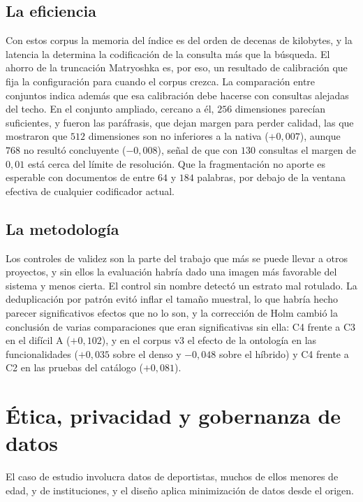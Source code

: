 \documentclass[11pt,letterpaper]{article}
\numberwithin{equation}{section}
\begin{document}
\subsection*{La eficiencia}
Con estos corpus la memoria del índice es del orden de decenas de kilobytes, y la latencia la determina la codificación de la consulta más que la búsqueda. El ahorro de la truncación Matryoshka es, por eso, un resultado de calibración que fija la configuración para cuando el corpus crezca. La comparación entre conjuntos indica además que esa calibración debe hacerse con consultas alejadas del techo. En el conjunto ampliado, cercano a él, $256$ dimensiones parecían suficientes, y fueron las paráfrasis, que dejan margen para perder calidad, las que mostraron que $512$ dimensiones son no inferiores a la nativa ($+0{,}007$), aunque $768$ no resultó concluyente ($-0{,}008$), señal de que con $130$ consultas el margen de $0{,}01$ está cerca del límite de resolución. Que la fragmentación no aporte es esperable con documentos de entre $64$ y $184$ palabras, por debajo de la ventana efectiva de cualquier codificador actual.

\subsection*{La metodología}
Los controles de validez son la parte del trabajo que más se puede llevar a otros proyectos, y sin ellos la evaluación habría dado una imagen más favorable del sistema y menos cierta. El control sin nombre detectó un estrato mal rotulado. La deduplicación por patrón evitó inflar el tamaño muestral, lo que habría hecho parecer significativos efectos que no lo son, y la corrección de Holm cambió la conclusión de varias comparaciones que eran significativas sin ella: C4 frente a C3 en el difícil A ($+0{,}102$), y en el corpus v3 el efecto de la ontología en las funcionalidades ($+0{,}035$ sobre el denso y $-0{,}048$ sobre el híbrido) y C4 frente a C2 en las pruebas del catálogo ($+0{,}081$).

\section{Ética, privacidad y gobernanza de datos}
\label{sec:etica}
El caso de estudio involucra datos de deportistas, muchos de ellos menores de edad, y de instituciones, y el diseño aplica minimización de datos desde el origen.
\end{document}
